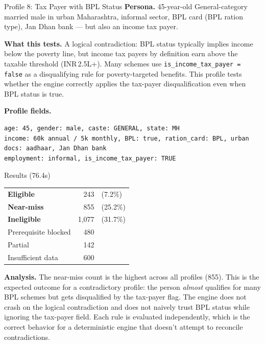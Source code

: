 \documentclass[11pt,a4paper]{article}
\newcommand{\rupee}{INR\,}
\newcommand{\ic}[1]{\texttt{\color{accent}#1}}
\begin{document}
\begin{profilebox}{Profile 8: Tax Payer with BPL Status}
\textbf{Persona.} 45-year-old General-category married male in urban Maharashtra, informal sector, BPL card (BPL ration type), Jan Dhan bank --- but also an income tax payer.

\textbf{What this tests.} A logical contradiction: BPL status typically implies income below the poverty line, but income tax payers by definition earn above the taxable threshold (\rupee 2.5L+). Many schemes use \ic{is\_income\_tax\_payer = false} as a disqualifying rule for poverty-targeted benefits. This profile tests whether the engine correctly applies the tax-payer disqualification even when BPL status is true.

\textbf{Profile fields.}
\begin{lstlisting}
age: 45, gender: male, caste: GENERAL, state: MH
income: 60k annual / 5k monthly, BPL: true, ration_card: BPL, urban
docs: aadhaar, Jan Dhan bank
employment: informal, is_income_tax_payer: TRUE
\end{lstlisting}

\begin{resultbox}{Results (76.4s)}
\begin{tabular}{@{}lrl@{}}
  \textcolor{eligible}{\textbf{Eligible}} & 243 & (7.2\%) \\
  \textcolor{nearmiss}{\textbf{Near-miss}} & 855 & (25.2\%) \\
  \textcolor{inelig}{\textbf{Ineligible}} & 1{,}077 & (31.7\%) \\
  Prerequisite blocked & 480 & \\
  Partial & 142 & \\
  Insufficient data & 600 & \\
\end{tabular}
\end{resultbox}

\textbf{Analysis.} The near-miss count is the highest across all profiles (855). This is the expected outcome for a contradictory profile: the person \textit{almost} qualifies for many BPL schemes but gets disqualified by the tax-payer flag. The engine does not crash on the logical contradiction and does not naively trust BPL status while ignoring the tax-payer field. Each rule is evaluated independently, which is the correct behavior for a deterministic engine that doesn't attempt to reconcile contradictions.
\end{profilebox}
\end{document}
